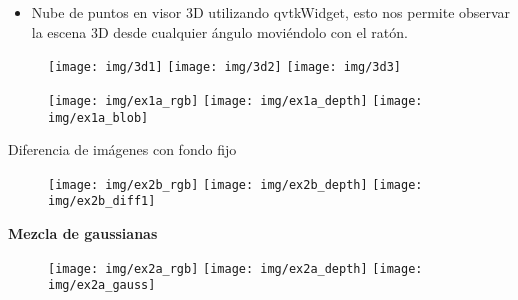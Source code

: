\documentclass[notes,slidesec,a4]{seminar}
\begin{document}

\begin{hslide}
\begin{itemize}
\item Nube de puntos en visor 3D utilizando qvtkWidget, esto nos permite observar la escena 3D desde cualquier ángulo moviéndolo con el ratón.
\end{itemize}
\begin{figure}
\begin{center}
	\texttt{[image: img/3d1]}
	\texttt{[image: img/3d2]}
	\texttt{[image: img/3d3]}
\end{center}
\end{figure}
\end{hslide}


\begin{hslide}
\begin{center}
\begin{figure}
	\texttt{[image: img/ex1a\_rgb]}
	\texttt{[image: img/ex1a\_depth]}
	\texttt{[image: img/ex1a\_blob]}
\end{figure}
\end{center}
\end{hslide}


\begin{hslide}
Diferencia de imágenes con fondo fijo
\begin{center}
\begin{figure}
	\texttt{[image: img/ex2b\_rgb]}
	\texttt{[image: img/ex2b\_depth]}
	\texttt{[image: img/ex2b\_diff1]}
\end{figure}
\end{center}
\textbf{Mezcla de gaussianas}
\begin{center}
\begin{figure}
	\texttt{[image: img/ex2a\_rgb]}
	\texttt{[image: img/ex2a\_depth]}
	\texttt{[image: img/ex2a\_gauss]}
\end{figure}
\end{center}
\end{hslide}
\end{document}
